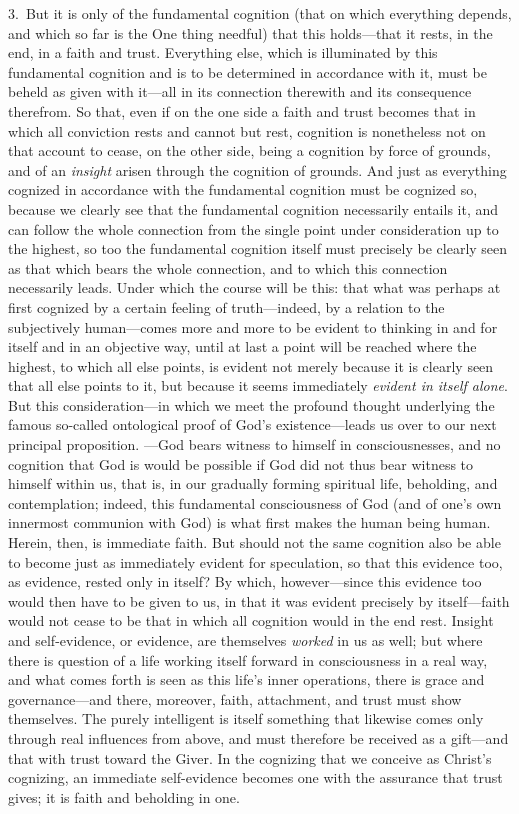 \documentclass[12pt,a4paper]{book}
\begin{document}
3.~But it is only of the fundamental cognition (that on which everything depends,
and which so far is the One thing needful) that this holds---that it rests, in the
end, in a faith and trust. Everything else, which is illuminated by this
fundamental cognition and is to be determined in accordance with it, must be
beheld as given with it---all in its connection therewith and its consequence
therefrom. So that, even if on the one side a faith and trust becomes that in
which all conviction rests and cannot but rest, cognition is nonetheless not on
that account to cease, on the other side, being a cognition by force of grounds,
and of an \emph{insight} arisen through the cognition of grounds. And just as
everything cognized in accordance with the fundamental cognition must be cognized
so, because we clearly see that the fundamental cognition necessarily entails it,
and can follow the whole connection from the single point under consideration up
to the highest, so too the fundamental cognition itself must precisely be clearly
seen as that which bears the whole connection, and to which this connection
necessarily leads. Under which the course will be this: that what was perhaps at
first cognized by a certain feeling of truth---indeed, by a relation to the
subjectively human---comes more and more to be evident to thinking in and for
itself and in an objective way, until at last a point will be reached where the
highest, to which all else points, is evident not merely because it is clearly
seen that all else points to it, but because it seems immediately \emph{evident in
itself alone}. But this consideration---in which we meet the profound thought
underlying the famous so-called ontological proof of God's existence---leads us
over to our next principal proposition. ---God bears witness to himself in
consciousnesses, and no cognition that God is would be possible if God did not
thus bear witness to himself within us, that is, in our gradually forming
spiritual life, beholding, and contemplation; indeed, this fundamental
consciousness of God (and of one's own innermost communion with God) is what
first makes the human being human. Herein, then, is immediate faith. But should
not the same cognition also be able to become just as immediately evident for
speculation, so that this evidence too, as evidence, rested only in itself? By
which, however---since this evidence too would then have to be given to us, in
that it was evident precisely by itself---faith would not cease to be that in
which all cognition would in the end rest. Insight and self-evidence, or evidence,
are themselves \emph{worked} in us as well; but where there is question of a life
working itself forward in consciousness in a real way, and what comes forth is
seen as this life's inner operations, there is grace and governance---and there,
moreover, faith, attachment, and trust must show themselves. The purely
intelligent is itself something that likewise comes only through real influences
from above, and must therefore be received as a gift---and that with trust toward
the Giver. In the cognizing that we conceive as Christ's cognizing, an immediate
self-evidence becomes one with the assurance that trust gives; it is faith and
beholding in one.
\end{document}
